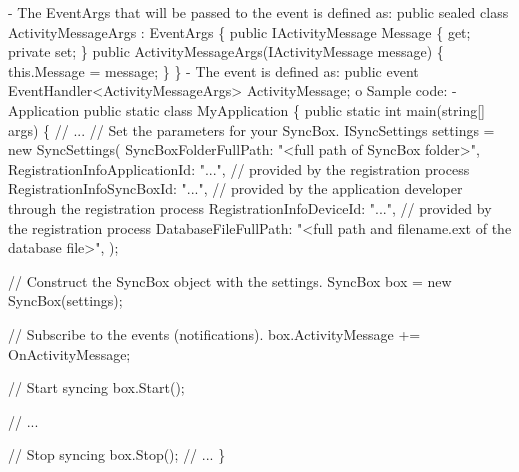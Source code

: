 \begin{DoxyCode}
    - The EventArgs that will be passed to the \textcolor{keyword}{event} is defined as:
          \textcolor{keyword}{public} sealed \textcolor{keyword}{class }ActivityMessageArgs : EventArgs
          \{
              \textcolor{keyword}{public} IActivityMessage Message \{ \textcolor{keyword}{get}; \textcolor{keyword}{private} \textcolor{keyword}{set}; \}
              \textcolor{keyword}{public} ActivityMessageArgs(IActivityMessage message)
              \{
                  this.Message = message;
              \}
          \}
    - The \textcolor{keyword}{event} is defined as:
          \textcolor{keyword}{public} \textcolor{keyword}{event} EventHandler<ActivityMessageArgs> ActivityMessage;
  o Sample code:
    - Application
      \textcolor{keyword}{public} \textcolor{keyword}{static} \textcolor{keyword}{class }MyApplication
      \{
          \textcolor{keyword}{public} \textcolor{keyword}{static} \textcolor{keywordtype}{int} main(\textcolor{keywordtype}{string}[] args)
          \{
              \textcolor{comment}{// ...}
              \textcolor{comment}{// Set the parameters for your SyncBox.}
              ISyncSettings settings = \textcolor{keyword}{new} SyncSettings(
                  SyncBoxFolderFullPath: \textcolor{stringliteral}{"<full path of SyncBox folder>"},
                  RegistrationInfoApplicationId: \textcolor{stringliteral}{"..."},   \textcolor{comment}{// provided by the
       registration process}
                  RegistrationInfoSyncBoxId: \textcolor{stringliteral}{"..."},       \textcolor{comment}{// provided by the
       application developer through the registration process}
                  RegistrationInfoDeviceId: \textcolor{stringliteral}{"..."},        \textcolor{comment}{// provided by the
       registration process}
                  DatabaseFileFullPath: \textcolor{stringliteral}{"<full path and filename.ext of the
       database file>"},
                   );
        
              \textcolor{comment}{// Construct the SyncBox object with the settings.}
              SyncBox box = \textcolor{keyword}{new} SyncBox(settings);

              \textcolor{comment}{// Subscribe to the events (notifications).}
              box.ActivityMessage += OnActivityMessage;
    
              \textcolor{comment}{// Start syncing}
              box.Start(); 
    
              \textcolor{comment}{// ...}
    
              \textcolor{comment}{// Stop syncing}
              box.Stop();
              \textcolor{comment}{// ...}
          \}


\end{DoxyCode}
